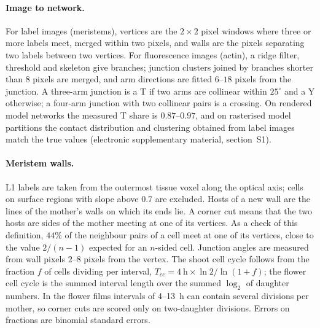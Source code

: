 \documentclass[11pt,a4paper]{article}
\begin{document}
\paragraph{Image to network.} For label images (meristems), vertices are the $2\times2$
pixel windows where three or more labels meet, merged within two pixels, and walls are the
pixels separating two labels between two vertices. For fluorescence images (actin), a
ridge filter, threshold and skeleton give branches; junction clusters joined by branches
shorter than 8 pixels are merged, and arm directions are fitted $6$--$18$ pixels from the
junction. A three-arm junction is a T if two arms are collinear within $25^\circ$ and a Y
otherwise; a four-arm junction with two collinear pairs is a crossing. On rendered model
networks the measured T share is $0.87$--$0.97$, and on rasterised model partitions the
contact distribution and clustering obtained from label images match the true values
(electronic supplementary material, section~S1).

\paragraph{Meristem walls.} L1 labels are taken from the outermost tissue voxel along the
optical axis; cells on surface regions with slope above $0.7$ are excluded. Hosts of a new
wall are the lines of the mother's walls on which its ends lie. A corner cut means that the
two hosts are sides of the mother meeting at one of its vertices. As a check of this
definition, $44\%$ of the neighbour pairs of a cell meet at one of its vertices, close to the
value $2/(n-1)$ expected for an $n$-sided cell. Junction angles are measured from wall pixels $2$--$8$
pixels from the vertex. The shoot cell cycle follows from the fraction $f$ of cells dividing
per interval, $T_{cc}=4~\mathrm{h}\times\ln2/\ln(1+f)$; the flower cell cycle is the summed
interval length over the summed $\log_2$ of daughter numbers. In the flower films intervals
of 4--13~h can contain several divisions per mother, so corner cuts are scored only on
two-daughter divisions. Errors on fractions are binomial standard errors.
\end{document}
